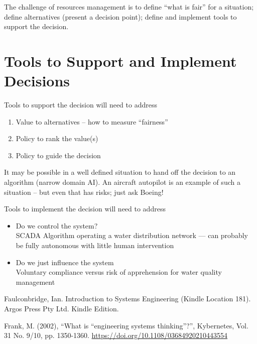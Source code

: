 \documentclass[11pt]{article}
\begin{document}
The challenge of resources management is to define ``what is fair'' for a situation; define alternatives (present a decision point); define and implement tools to support the decision.
\section{Tools to Support and Implement Decisions}
Tools to support the decision will need to address
\begin{enumerate}
\item Value to alternatives -- how to measure ``fairness''
\item Policy to rank the value(s)
\item Policy to guide the decision
\end{enumerate}
It may be possible in a well defined situation to hand off the decision to an algorithm (narrow domain AI). 
An aircraft autopilot is an example of such a situation -- but even that has risks; just ask Boeing!

Tools to implement the decision will need to address
\begin{itemize}
\item Do we control the system?  \\ SCADA Algorithm operating a water distribution network --- can
probably be fully autonomous with little human intervention
\item Do we just influence the system \\Voluntary compliance versus risk of apprehension for water quality
management
\end{itemize}



\begin{thebibliography}{9}


Faulconbridge, Ian. Introduction to Systems Engineering (Kindle Location 181). Argos Press Pty Ltd. Kindle Edition. 

Frank, M. (2002), ``What is ``engineering systems thinking''?'', Kybernetes, Vol. 31 No. 9/10, pp. 1350-1360. \url{https://doi.org/10.1108/03684920210443554}
\end{thebibliography}
\end{document}
